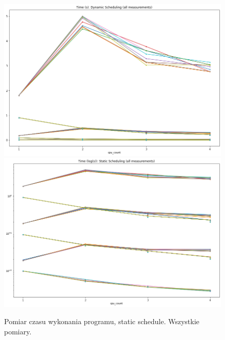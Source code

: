 \documentclass{article}
\begin{document}
        \begin{figure}[h!]
            \centering
            \includegraphics[width=17cm]{report2/images/Type/ex3_static_all.png}
            \includegraphics[width=17cm]{report2/images/Type/ex3_static_all_log.png}
            \caption{Pomiar czasu wykonania programu, static schedule. Wszystkie pomiary. }
        \end{figure}
        \newpage
\end{document}
